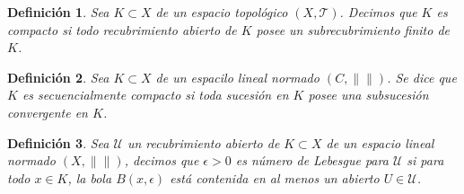 \documentclass[12pt]{book}
\newtheorem{defn}{\bf Definición}[chapter]
\newcommand{\norm}[1]{\lVert #1\rVert }
\begin{document}
\begin{defn} Sea  $K\subset X$ de un espacio topológico $(X,\mathcal{T})$. Decimos que $K$ es 
compacto si  todo recubrimiento abierto de $K$ posee un subrecubrimiento finito de $K$.
\end{defn}

\begin{defn} Sea $K\subset X$ de un espacilo lineal normado $(C,\norm{})$. Se dice que $K$ es 
secuencialmente compacto si toda sucesión en $K$ posee una subsucesión convergente en $K$.
\end{defn}
\begin{defn} Sea $\mathcal{U}$ un recubrimiento abierto de $K\subset X$ de un espacio lineal 
normado $(X,\norm{})$, decimos que $\epsilon>0$   es número de Lebesgue para $\mathcal{U}$ si 
para todo $x\in K$, la bola $B(x,\epsilon)$ está contenida en al menos  un abierto $U\in\mathcal{U}
$.
\end{defn}
 
\end{document}

